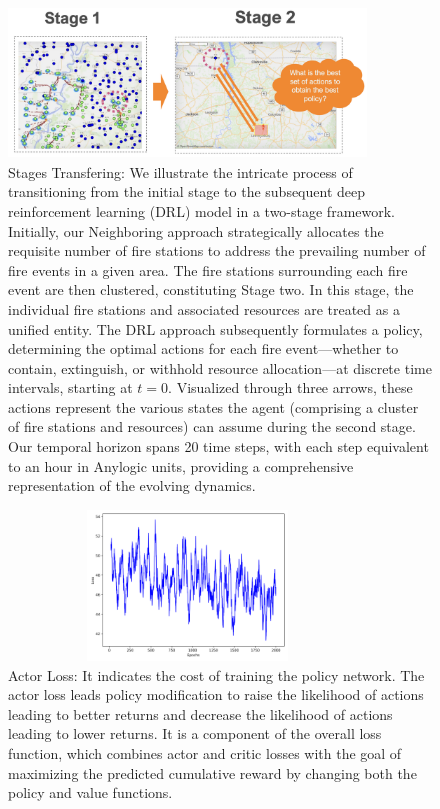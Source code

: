 \documentclass[lettersize,journal]{IEEEtran}
\begin{document}
\begin{figure}[H]
  \centering
  \includegraphics[height=4cm,width=9.5cm]{figs/stages.png}
  \caption{Stages Transfering: We illustrate the intricate process of transitioning from the initial stage to the subsequent deep reinforcement learning (DRL) model in a two-stage framework. Initially, our Neighboring approach strategically allocates the requisite number of fire stations to address the prevailing number of fire events in a given area. The fire stations surrounding each fire event are then clustered, constituting Stage two. In this stage, the individual fire stations and associated resources are treated as a unified entity. The DRL approach subsequently formulates a policy, determining the optimal actions for each fire event—whether to contain, extinguish, or withhold resource allocation—at discrete time intervals, starting at $t=0$. Visualized through three arrows, these actions represent the various states the agent (comprising a cluster of fire stations and resources) can assume during the second stage. Our temporal horizon spans 20 time steps, with each step equivalent to an hour in Anylogic units, providing a comprehensive representation of the evolving dynamics.}\end{figure}


  \begin{figure}[H]
    \centering
    \includegraphics[height=4cm,width=9.5cm]{figs/manager_actor_loss.png}
    \caption{Actor Loss: It indicates the cost of training the policy network. The actor loss leads policy modification to raise the likelihood of actions leading to better returns and decrease the likelihood of actions leading to lower returns. It is a component of the overall loss function, which combines actor and critic losses with the goal of maximizing the predicted cumulative reward by changing both the policy and value functions. }\end{figure}
  
\end{document}

